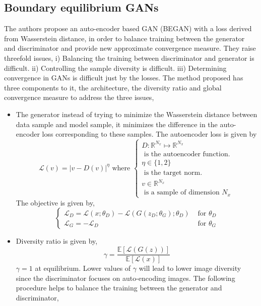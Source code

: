 \subsection*{Boundary equilibrium GANs \citep{began}}
The authors propose an auto-encoder based GAN (BEGAN) with a loss derived from Wasserstein distance, in order to balance training between the generator and discriminator and provide new approximate convergence measure. They raise threefold issues, i) Balancing the training between discriminator and generator is difficult. ii)  Controlling the sample diversity is difficult. iii) Determining convergence in GANs is difficult just by the losses. The method proposed has three components to it, the architecture, the diversity ratio and global convergence measure to address the three issues,
\begin{itemize}
    \item The generator instead of trying to minimize the Wasserstein distance between data sample and model sample, it minimizes the difference in the auto-encoder loss corresponding to these samples. 
    The autoencoder loss is given by
    $$
\mathcal{L}(v)=|v-D(v)|^{\eta} \text { where }\left\{\begin{array}{ll}{D : \mathbb{R}^{N_{x}} \mapsto \mathbb{R}^{N_{x}}} \\ {\text { is the autoencoder function. }} \\ {\eta \in\{1,2\}} \\ {\text { is the target norm. }} \\ {v \in \mathbb{R}^{N_{x}}} \\ {\text { is a sample of dimension } N_{x}}\end{array}\right.
$$
    The objective is given by,
    \begin{equation}
    \label{eq:began}
\left\{\begin{array}{ll}{\mathcal{L}_{D}=\mathcal{L}\left(x ; \theta_{D}\right)-\mathcal{L}\left(G\left(z_{D} ; \theta_{G}\right) ; \theta_{D}\right)} & {\text { for } \theta_{D}} \\ {\mathcal{L}_{G}=-\mathcal{L}_{D}} & {\text { for } \theta_{G}}\end{array}\right.
\end{equation}
\item Diversity ratio is given by,
$$
\gamma=\frac{\mathbb{E}[\mathcal{L}(G(z))]}{\mathbb{E}[\mathcal{L}(x)]}
$$
$\gamma =1$ at equilibrium. Lower values of $\gamma$ will lead to lower image diversity since the discriminator focuses on auto-encoding images. The following procedure helps to balance the training between the generator and discriminator,

\end{itemize}
